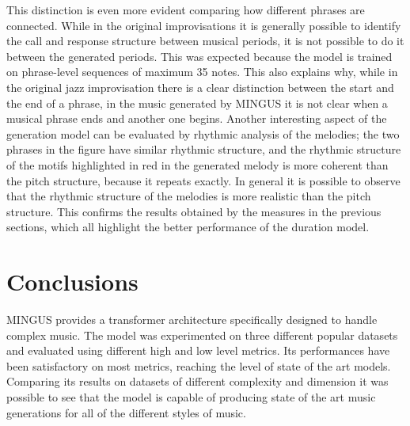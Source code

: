\documentclass{article}
\begin{document}
This distinction is even more evident comparing how different phrases are connected. While in the original improvisations it is generally possible to identify the call and response structure between musical periods, it is not possible to do it between the generated periods. This was expected because the model is trained on phrase-level sequences of maximum 35 notes. This also explains why, while in the original jazz improvisation there is a clear distinction between the start and the end of a phrase, in the music generated by MINGUS it is not clear when a musical phrase ends and another one begins. 
Another interesting aspect of the generation model can be evaluated by rhythmic analysis of the melodies; the two phrases in the figure have similar rhythmic structure, and the rhythmic structure of the motifs highlighted in red in the generated melody is more coherent than the pitch structure, because it repeats exactly. 
In general it is possible to observe that the rhythmic structure of the melodies is more realistic than the pitch structure. This confirms the results obtained by the measures in the previous sections, which all highlight the better performance of the duration model.

\newpage
\section{Conclusions} \label{sec:conclusion}
MINGUS provides a transformer architecture specifically designed to handle complex music. The model was experimented on three different popular datasets and evaluated using different high and low level metrics. Its performances have been satisfactory on most metrics, reaching the level of state of the art models. Comparing its results on datasets of different complexity and dimension it was possible to see that the model is capable of producing state of the art music generations for all of the different styles of music. 
\end{document}
